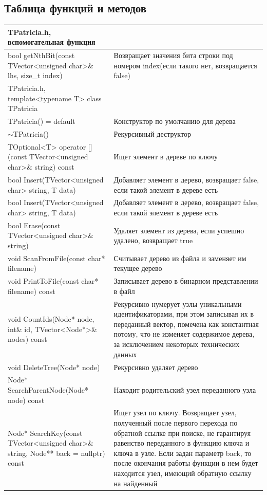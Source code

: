 \pagebreak
\subsection{Таблица функций и методов}
\begin{longtable}{|p{7.5cm}|p{7.5cm}|}
\hline
\rowcolor{lightgray}
\multicolumn{2}{|c|} {TPatricia.h, вспомогательная функция}\\
\hline
bool getNthBit(const TVector<unsigned char>\& lhs, size\_t index)&Возвращает значения бита строки под номером index(если такого нет, возвращается false)\\
\hline
\rowcolor{lightgray}
\multicolumn{2}{|c|} {TPatricia.h, template<typename T> class TPatricia}\\
\hline
TPatricia() = default & Конструктор по умолчанию для дерева\\
\hline
$\sim$TPatricia() & Рекурсивный деструктор\\
\hline
TOptional<T> operator [] (const TVector<unsigned char>\& string) const & Ищет элемент в дереве по ключу\\
\hline
bool Insert(TVector<unsigned char> string, T data) & Добавляет элемент в дерево, возвращает false, если такой элемент в дереве есть\\
\hline
bool Insert(TVector<unsigned char> string, T data) & Добавляет элемент в дерево, возвращает false, если такой элемент в дереве есть\\
\hline
bool Erase(const TVector<unsigned char>\& string)&Удаляет элемент из дерева, если успешно удалено, возвращает true\\
\hline
void ScanFromFile(const char* filename)&Считывает дерево из файла и заменяет им текущее дерево\\
\hline
void PrintToFile(const char* filename) const&Записывает дерево в бинарном представлении в файл\\
\hline
void CountIds(Node* node, int\& id, TVector<Node*>\& nodes) const&Рекурсивно нумерует узлы уникальными идентификаторами, при этом записывая их в переданный вектор, помечена как константная потому, что не изменяет содержимое дерева, за исключением некоторых технических данных\\
\hline 
void DeleteTree(Node* node)&Рекурсивно удаляет дерево\\
\hline 
Node* SearchParentNode(Node* node) const&Находит родительский узел переданного узла\\
\hline 
Node* SearchKey(const TVector<unsigned char>\& string, Node** back = nullptr) const&Ищет узел по ключу. Возвращает узел, полученный после первого перехода по обратной ссылке при поиске, не гарантируя равенство переданного в функцию ключа и ключа в узле. Если задан параметр back, то после окончания работы функции в нем будет находится узел, имеющий обратную ссылку на найденный\\

\end{longtable}
